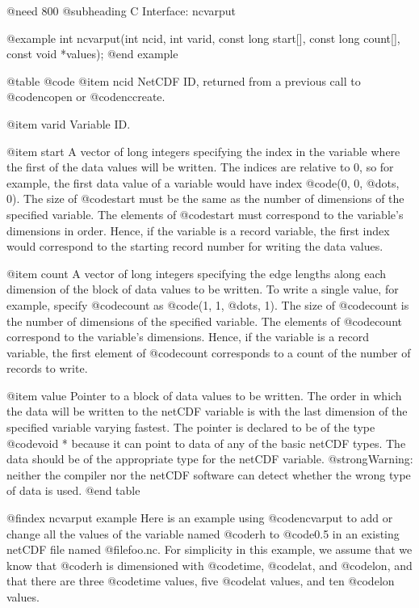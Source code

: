 @need 800
@subheading C Interface:  ncvarput

@example
int ncvarput(int ncid, int varid, const long start[], const long count[],
             const void *values);
@end example

@table @code
@item ncid
NetCDF ID, returned from a previous call to @code{ncopen} or @code{nccreate}.

@item varid
Variable ID.

@item start
A vector of long integers specifying the index in the variable
where the first of the data values will be
written.  The indices are relative to 0, so for example, the first data
value of a variable would have index @code{(0, 0, @dots{}, 0)}.  The
size of @code{start} must be the same as the number of dimensions of the
specified variable.  The elements of @code{start} must correspond to the
variable's dimensions in order.  Hence, if the variable is a record
variable, the first index would correspond to the starting record number
for writing the data values.

@item count
A vector of long integers specifying the edge lengths along each
dimension of the block of data values to be written.
To write a single value, for example, specify @code{count} as
@code{(1, 1, @dots{}, 1)}.  The size of @code{count} is the number of
dimensions of the specified variable.  The elements of @code{count}
correspond to the variable's dimensions.  Hence, if the variable is a
record variable, the first element of @code{count} corresponds to a
count of the number of records to write.

@item value
Pointer to a block of data values to be written.  The order in which the
data will be written to the netCDF variable
is with the last dimension of the specified variable
varying fastest.
The pointer is declared to be of the type
@code{void *} because it can point to data of any of the basic netCDF
types.  The data should be of the appropriate type for the netCDF
variable.  @strong{Warning: neither the compiler nor the netCDF software
can detect whether the wrong type of data is used.}
@end table

@findex ncvarput example
Here is an example using @code{ncvarput} to add or change all the values
of the variable named @code{rh} to @code{0.5} in an existing netCDF file
named @file{foo.nc}.  For simplicity in this example, we assume that we
know that @code{rh} is dimensioned with @code{time}, @code{lat}, and
@code{lon}, and that there are three @code{time} values, five @code{lat}
values, and ten @code{lon} values.

